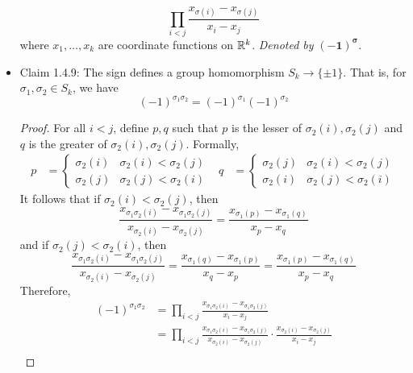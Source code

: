 \documentclass[../notes.tex]{subfiles}
\begin{document}
\begin{itemize}
\begin{equation*}
        \prod_{i<j}\frac{x_{\sigma(i)}-x_{\sigma(j)}}{x_i-x_j}
    \end{equation*}
    where $x_1,\dots,x_k$ are coordinate functions on $\mathbb{R}^k$. \emph{Denoted by} $\bm{(-1)^\sigma}$.
    \item Claim 1.4.9: The sign defines a group homomorphism $S_k\to\{\pm 1\}$. That is, for $\sigma_1,\sigma_2\in S_k$, we have
    \begin{equation*}
        (-1)^{\sigma_1\sigma_2} = (-1)^{\sigma_1}(-1)^{\sigma_2}
    \end{equation*}
    \begin{proof}
        For all $i<j$, define $p,q$ such that $p$ is the lesser of $\sigma_2(i),\sigma_2(j)$ and $q$ is the greater of $\sigma_2(i),\sigma_2(j)$. Formally,
        \begin{align*}
            p &=
            \begin{cases}
                \sigma_2(i) & \sigma_2(i)<\sigma_2(j)\\
                \sigma_2(j) & \sigma_2(j)<\sigma_2(i)
            \end{cases}&
            q &=
            \begin{cases}
                \sigma_2(j) & \sigma_2(i)<\sigma_2(j)\\
                \sigma_2(i) & \sigma_2(j)<\sigma_2(i)
            \end{cases}
        \end{align*}
        It follows that if $\sigma_2(i)<\sigma_2(j)$, then
        \begin{equation*}
            \frac{x_{\sigma_1\sigma_2(i)}-x_{\sigma_1\sigma_2(j)}}{x_{\sigma_2(i)}-x_{\sigma_2(j)}} = \frac{x_{\sigma_1(p)}-x_{\sigma_1(q)}}{x_p-x_q}
        \end{equation*}
        and if $\sigma_2(j)<\sigma_2(i)$, then
        \begin{equation*}
            \frac{x_{\sigma_1\sigma_2(i)}-x_{\sigma_1\sigma_2(j)}}{x_{\sigma_2(i)}-x_{\sigma_2(j)}} = \frac{x_{\sigma_1(q)}-x_{\sigma_1(p)}}{x_q-x_p}
            = \frac{x_{\sigma_1(p)}-x_{\sigma_1(q)}}{x_p-x_q}
        \end{equation*}
        Therefore,
        \begin{align*}
            (-1)^{\sigma_1\sigma_2} &= \prod_{i<j}\frac{x_{\sigma_1\sigma_2(i)}-x_{\sigma_1\sigma_2(j)}}{x_i-x_j}\\
            &= \prod_{i<j}\frac{x_{\sigma_1\sigma_2(i)}-x_{\sigma_1\sigma_2(j)}}{x_{\sigma_2(i)}-x_{\sigma_2(j)}}\cdot\frac{x_{\sigma_2(i)}-x_{\sigma_2(j)}}{x_i-x_j}\\

\end{align*}
\end{proof}
\end{itemize}
\end{document}
